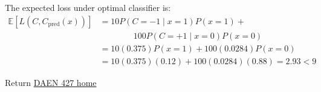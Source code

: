 \documentclass[14pt]{extarticle}
\begin{document}
\begin{enumerate}
The expected loss under optimal classifier is:
\begin{align*}
\mathbb{E}[L(C,C_{\mathrm{pred}}(x))]&=10P(C=-1 \mid x=1)P(x=1)+\\
&\qquad \qquad 100P(C=+1 \mid x=0)P(x=0)\\
&=10(0.375)P(x=1)+100(0.0284)P(x=0)\\
&=10(0.375)(0.12)+100(0.0284)(0.88) = 2.93 < 9
\end{align*}

\end{enumerate}

Return \href{https://abuabara.github.io/DAEN427F25/}{DAEN 427 home}
\end{document}
